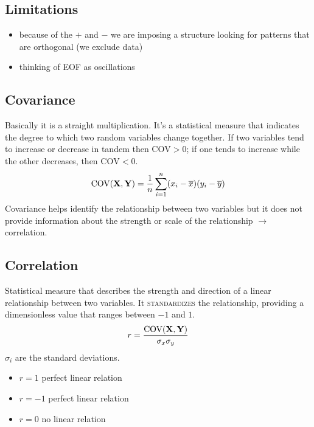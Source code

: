 \subsection{Limitations}\label{subsec:eof-limitations}
\begin{itemize}
	\item because of the $+$ and $-$ we are imposing a structure looking for patterns that are orthogonal (we exclude data)
	\item thinking of EOF as oscillations
\end{itemize}

\subsection{Covariance}\label{subsec:covariance}
Basically it is a straight multiplication.
It's a statistical measure that indicates the degree to which two random variables change together. If two variables tend to increase or decrease in tandem then $\text{COV}>0$; if one tends to increase while the other decreases, then $\text{COV}<0$.
\begin{equation}
	\text{COV}(\mathbf{X},\mathbf{Y}) = \frac{1}{n}\sum_{i=1}^n(x_i-\overline{x})(y_i-\overline{y})
	\label{eq:covariance-def}
\end{equation}
Covariance helps identify the relationship between two variables but it does not provide information about the strength or scale of the relationship $\rightarrow$ correlation.

\subsection{Correlation}\label{subsec:correlation}
Statistical measure that describes the strength and direction of a linear relationship between two variables. It \textsc{standardizes} the relationship, providing a dimensionless value that ranges between $-1$ and $1$.
\begin{equation}
	r=\frac{\text{COV}(\mathbf{X},\mathbf{Y})}{\sigma_x\sigma_y}
	\label{eq:linear-correlation-def}
\end{equation}
$\sigma_i$ are the standard deviations.
\begin{itemize}
	\item $r=1$ perfect  linear relation
	\item $r=-1$  perfect  linear relation
	\item $r=0$ no linear relation
\end{itemize}